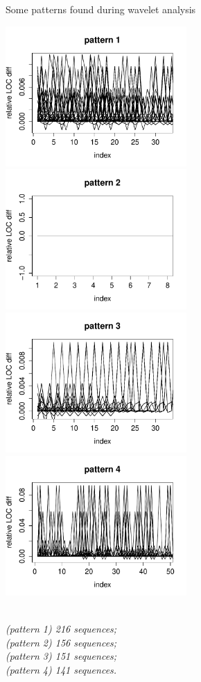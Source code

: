\begin{figure}[H]
\caption{Some patterns found during wavelet
analysis}\label{figure:patterns_plots}
\caption*{\\[1em]\footnotesize\emph{(pattern 1) 216 sequences;\\ (pattern 2) 156
sequences;\\ (pattern 3) 151 sequences;\\ (pattern 4) 141 sequences.}\\[1em]}
\centering
	\includegraphics[width=196pt]{images/pattern_1.pdf}
	\hspace{1em}
	\includegraphics[width=196pt]{images/pattern_2.pdf}
	\\
	\vspace{1em}
	\includegraphics[width=196pt]{images/pattern_3.pdf}
	\hspace{1em}
	\includegraphics[width=196pt]{images/pattern_4.pdf}
\end{figure}